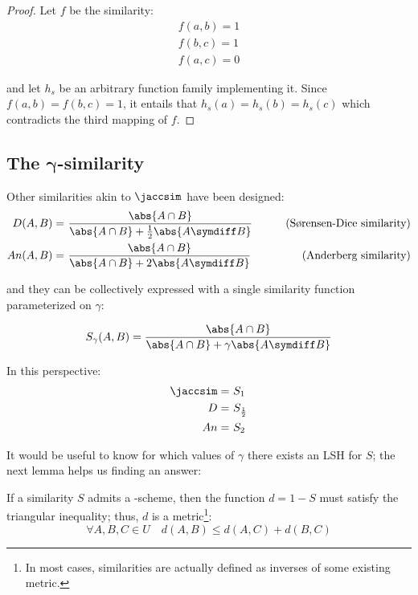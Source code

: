 \begin{proof}
    Let $f$ be the similarity:
    \begin{align*}
        f(a, b) = 1 \\
        f(b, c) = 1 \\
        f(a, c) = 0
    \end{align*}

    and let $h_s$ be an arbitrary function family implementing it. Since $f(a, b) = f(b, c) = 1$, it entails that $h_s(a) = h_s(b) = h_s(c)$ which contradicts the third mapping of $f$.
\end{proof}


\subsection[\texorpdfstring{The $\gamma$-similarity}{The gamma-similarity}]{The $\bm\gamma$-similarity}

Other similarities akin to $\jaccsim$ have been designed:
\begin{align*}
    D(A, B)  =&\ \frac{\abs{A \cap B}}{\abs{A \cap B} + \frac{1}{2} \abs{A \symdiff B}} & \tag{S\o{}rensen-Dice similarity} \\
    An(A, B) =&\ \frac{\abs{A \cap B}}{\abs{A \cap B} + 2 \abs{A \symdiff B}}           & \tag{Anderberg similarity}
\end{align*}

and they can be collectively expressed with a single similarity function parameterized on $\gamma$:

\begin{definition}
    \begin{equation}
    \displaystyle S_\gamma(A, B) = \frac{\abs{A \cap B}}{\abs{A \cap B} + \gamma \abs{A \symdiff B}}
    \end{equation}
\end{definition}

In this perspective:
\begin{align*}
    \jaccsim =&\ S_1 \\
    D        =&\ S_\frac{1}{2} \\
    An       =&\ S_2
\end{align*}

It would be useful to know for which values of $\gamma$ there exists an LSH for $S$; the next lemma helps us finding an answer:

\begin{lemma}[Charikar] \label{lem:charikar}
    If a similarity $S$ admits a \lsh-scheme, then the function $d = 1 - S$ must satisfy the triangular inequality; thus, $d$ is a metric\footnote{In most cases, similarities are actually defined as inverses of some existing metric.}:
    \[
        \forall A, B, C \in U \quad d(A, B) \leq d(A, C) + d(B, C)
    \]
\end{lemma}


